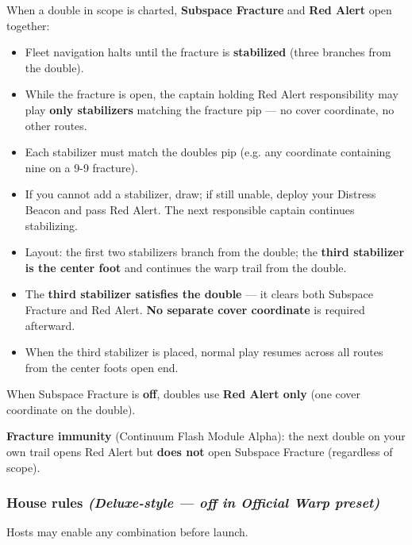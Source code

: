 \documentclass[11pt]{article}
\providecommand{\tightlist}{%
  \setlength{\itemsep}{0pt}\setlength{\parskip}{0pt}}
\begin{document}
When a double in scope is charted, \textbf{Subspace Fracture} and
\textbf{Red Alert} open together:

\begin{itemize}
\tightlist
\item
  Fleet navigation halts until the fracture is \textbf{stabilized}
  (three branches from the double).
\item
  While the fracture is open, the captain holding Red Alert
  responsibility may play \textbf{only stabilizers} matching the
  fracture pip --- no cover coordinate, no other routes.
\item
  Each stabilizer must match the double\textquotesingle s pip (e.g. any
  coordinate containing nine on a 9-9 fracture).
\item
  If you cannot add a stabilizer, draw; if still unable, deploy your
  Distress Beacon and pass Red Alert. The next responsible captain
  continues stabilizing.
\item
  Layout: the first two stabilizers branch from the double; the
  \textbf{third stabilizer is the center foot} and continues the warp
  trail from the double.
\item
  The \textbf{third stabilizer satisfies the double} --- it clears both
  Subspace Fracture and Red Alert. \textbf{No separate cover coordinate} is
  required afterward.
\item
  When the third stabilizer is placed, normal play resumes across all
  routes from the center foot\textquotesingle s open end.
\end{itemize}

When Subspace Fracture is \textbf{off}, doubles use \textbf{Red Alert
only} (one cover coordinate on the double).

\textbf{Fracture immunity} (Continuum Flash Module Alpha): the next
double on your own trail opens Red Alert but \textbf{does not} open
Subspace Fracture (regardless of scope).

\subsubsection{\texorpdfstring{House rules \emph{(Deluxe-style --- off
in Official Warp
preset)}}{House rules (Deluxe-style --- off in Official Warp preset)}}\label{house-rules-deluxe-style--off-in-official-warp-preset}

Hosts may enable any combination before launch.
\end{document}
